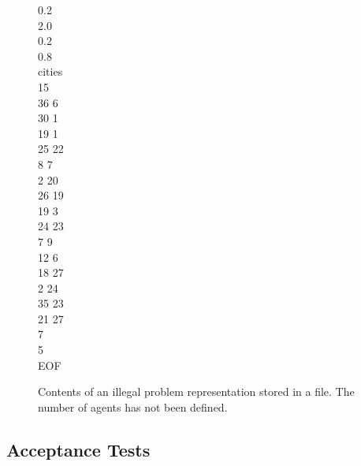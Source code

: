 \begin{figure}[H]
0.2 \\
2.0 \\
0.2 \\
0.8 \\
cities \\
15 \\
36 6 \\
30 1 \\
19 1 \\
25 22 \\
8 7 \\
2 20 \\
26 19 \\
19 3 \\
24 23 \\
7 9 \\
12 6 \\
18 27 \\
2 24 \\
35 23 \\
21 27 \\
7 \\
5 \\
EOF
\caption{Contents of an illegal problem representation stored in a file. The number of agents has not been defined.}
\label{invalidConfigMissing}
\end{figure}

\subsection{Acceptance Tests}
\label{AcceptanceTestz}

